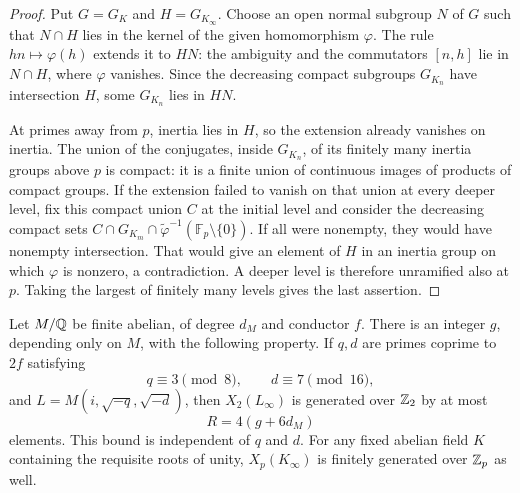 \begin{proof}
Put $G=G_K$ and $H=G_{K_\infty}$. Choose an open normal subgroup
$N$ of $G$ such that $N\cap H$ lies in the kernel of the given
homomorphism $\varphi$. The rule $hn\mapsto\varphi(h)$ extends
it to $HN$: the ambiguity and the commutators $[n,h]$ lie in
$N\cap H$, where $\varphi$ vanishes. Since the decreasing compact subgroups $G_{K_n}$
have intersection $H$, some $G_{K_n}$ lies in $HN$.

At primes away from $p$, inertia lies in $H$, so the extension
already vanishes on inertia. The union of the conjugates, inside
$G_{K_n}$, of its finitely many inertia groups above $p$ is compact:
it is a finite union of continuous images of products of compact
groups. If the extension failed to vanish on that union at every
deeper level, fix this compact union $C$ at the initial level and
consider the decreasing compact sets
$C\cap G_{K_m}\cap\widetilde\varphi^{-1}(\mathbb F_p\setminus\{0\})$.
If all were nonempty, they
would have nonempty intersection. That would give an element of
$H$ in an inertia group on which $\varphi$ is nonzero, a
contradiction. A deeper level is therefore unramified also at $p$.
Taking the largest of finitely many levels gives the last assertion.
\end{proof}

\begin{proposition}
\label{ct-uniform-generators}
Let $M/\mathbb Q$ be finite abelian, of degree $d_M$ and conductor $f$.
There is an integer $g$, depending only on $M$, with the following
property. If $q,d$ are primes coprime to $2f$ satisfying
\[
                    q\equiv3\pmod8,
       \qquad       d\equiv7\pmod {16},
\]
and $L=M(i,\sqrt{-q},\sqrt{-d})$, then
$X_2(L_\infty)$ is generated over $\mathbb Z_2$ by at most
\[
                         R=4(g+6d_M)
\]
elements. This bound is independent of $q$ and $d$.
For any fixed abelian field $K$ containing the requisite roots of
unity, $X_p(K_\infty)$ is finitely generated over $\mathbb Z_p$ as well.
\end{proposition}

